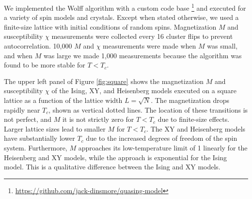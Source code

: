\documentclass[amsmath,amssymb,aps,twocolumn,nofootinbib]{revtex4-2}
\begin{document}
We implemented the Wolff algorithm with a custom code base \footnote{\url{https://github.com/jack-dinsmore/quasing-model}} and executed for a variety of spin models and crystals. Except when stated otherwise, we used a finite-size lattice with initial conditions of random spins. Magnetization $M$ and susceptibility $\chi$ measurements were collected every 16 cluster flips to prevent autocorrelation. 10,000 $M$ and $\chi$ measurements were made when $M$ was small, and when $M$ was large we made 1,000 measurements because the algorithm was found to be more stable for $T< T_c$.

The upper left panel of Figure \ref{fig:square} shows the magnetization $M$ and susceptibility $\chi$ of the Ising, XY, and Heisenberg models executed on a square lattice as a function of the lattice width $L = \sqrt{N}$. The magnetization drops rapidly near $T_c$, shown as vertical dotted lines. The location of these transitions is not perfect, and $M$ it is not strictly zero for $T<T_c$ due to finite-size effects. Larger lattice sizes lead to smaller $M$ for $T<T_c$. The XY and Heisenberg models have substantially lower $T_c$ due to the increased degrees of freedom of the spin system. Furthermore, $M$ approaches its low-temperature limit of 1 linearly for the Heisenberg and XY models, while the approach is exponential for the Ising model. This is a qualitative difference between the Ising and XY models.
\end{document}

